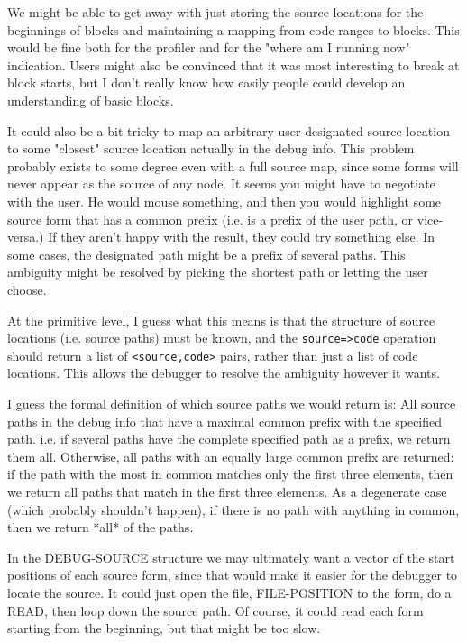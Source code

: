 We might be able to get away with just storing the source locations for the
beginnings of blocks and maintaining a mapping from code ranges to blocks.
This would be fine both for the profiler and for the "where am I running now"
indication.  Users might also be convinced that it was most interesting to
break at block starts, but I don't really know how easily people could develop
an understanding of basic blocks.

It could also be a bit tricky to map an arbitrary user-designated source
location to some "closest" source location actually in the debug info.
This problem probably exists to some degree even with a full source map, since
some forms will never appear as the source of any node.  It seems you might
have to negotiate with the user.  He would mouse something, and then you would
highlight some source form that has a common prefix (i.e. is a prefix of the
user path, or vice-versa.)  If they aren't happy with the result, they could
try something else.  In some cases, the designated path might be a prefix of
several paths.  This ambiguity might be resolved by picking the shortest path
or letting the user choose.

At the primitive level, I guess what this means is that the structure of source
locations (i.e. source paths) must be known, and the \verb+source=>code+ operation
should return a list of \verb+<source,code>+ pairs, rather than just a list of code
locations.  This allows the debugger to resolve the ambiguity however it wants.

I guess the formal definition of which source paths we would return is:
    All source paths in the debug info that have a maximal common prefix with
    the specified path.  i.e. if several paths have the complete specified path
    as a prefix, we return them all.  Otherwise, all paths with an equally
    large common prefix are returned: if the path with the most in common
    matches only the first three elements, then we return all paths that match
    in the first three elements.  As a degenerate case (which probably
    shouldn't happen), if there is no path with anything in common, then we
    return *all* of the paths.



In the DEBUG-SOURCE structure we may ultimately want a vector of the start
positions of each source form, since that would make it easier for the debugger
to locate the source.  It could just open the file, FILE-POSITION to the form,
do a READ, then loop down the source path.  Of course, it could read each form
starting from the beginning, but that might be too slow.


